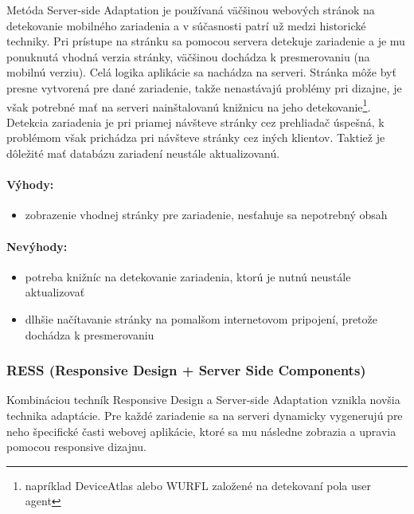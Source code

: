Metóda Server-side Adaptation je používaná väčšinou webových stránok na detekovanie mobilného zariadenia a v súčasnosti patrí už medzi historické techniky. Pri prístupe na stránku sa pomocou servera detekuje zariadenie a je mu ponuknutá vhodná verzia stránky, väčšinou dochádza k presmerovaniu (na mobilnú verziu). Celá logika aplikácie sa nachádza na serveri. Stránka môže byť presne vytvorená pre dané zariadenie, takže nenastávajú problémy pri dizajne, je však potrebné mať na serveri nainštalovanú knižnicu na jeho detekovanie\footnote{napríklad DeviceAtlas alebo WURFL založené na detekovaní pola user agent}. Detekcia zariadenia je pri priamej návšteve stránky cez prehliadač úspešná, k problémom však prichádza pri návšteve stránky cez iných klientov. Taktiež je dôležité mať databázu zariadení neustále aktualizovanú.

\paragraph{Výhody:}
\begin{itemize}
	\item zobrazenie vhodnej stránky pre zariadenie, nesťahuje sa nepotrebný obsah
\end{itemize}

\paragraph{Nevýhody:}
\begin{itemize}
	\item potreba knižníc na detekovanie zariadenia, ktorú je nutnú neustále aktualizovať
	\item dlhšie načítavanie stránky na pomalšom internetovom pripojení, pretože dochádza k presmerovaniu
\end{itemize}


\subsubsection{RESS (Responsive Design + Server Side Components)} %
\label{ssub:ress_responsive_design_server_side_components_}

Kombináciou techník Responsive Design a Server-side Adaptation vznikla novšia technika adaptácie. Pre každé zariadenie sa na serveri dynamicky vygenerujú pre neho špecifické časti webovej aplikácie, ktoré sa mu následne zobrazia a upravia pomocou responsive dizajnu.

